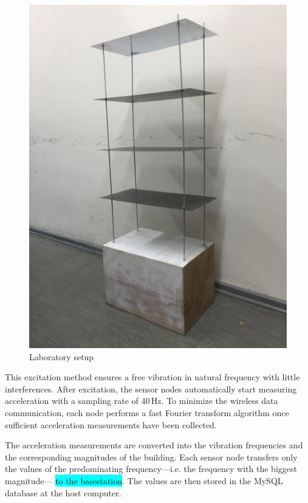 \documentclass[12pt,a4paper]{scrartcl}
\begin{document}

\begin{figure}[h!]
    \centering
    \includegraphics[scale=0.4]{figures/teststructure.jpg}
    \caption{Laboratory setup}
    \label{fig:teststructure}
\end{figure}

This excitation method ensures a free vibration in natural frequency with little interferences.
After excitation, the sensor nodes automatically start measuring acceleration with a sampling rate of 40\,Hz.
To minimize the wireless data communication, each node performs a fast Fourier transform algorithm once sufficient acceleration measurements have been collected.

The acceleration measurements are converted into the vibration frequencies and the corresponding magnitudes of the building.
Each sensor node transfers only the values of the predominating frequency---i.e. the frequency with the biggest magnitude--- \colorbox{cyan}{to the basestation}. 
The values are then stored in the MySQL database at the host computer.
\end{document}
